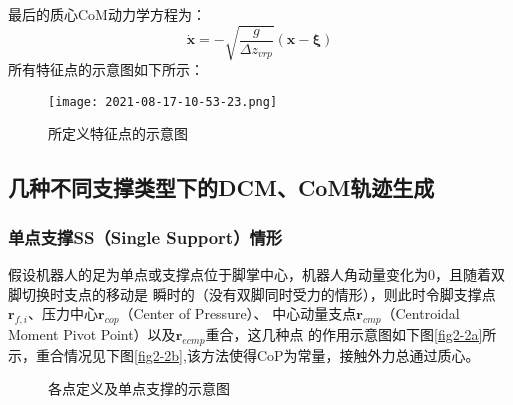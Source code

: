             最后的质心CoM动力学方程为：
            \begin{equation}
                \boldsymbol{\dot{x}}=-\sqrt{\frac{g}{\varDelta z_{vrp}}}\left( \boldsymbol{x}-\boldsymbol{\xi } \right) 
                \label{equ2-9}
            \end{equation}
            所有特征点的示意图如下所示：
            \begin{figure}[h] 
                \centering
                \texttt{[image: 2021-08-17-10-53-23.png]}
                \caption{所定义特征点的示意图} \label{fig2-1}
            \end{figure}
            \FloatBarrier
    \subsection{几种不同支撑类型下的DCM、CoM轨迹生成}
        \subsubsection{单点支撑SS（Single Support）情形}
            假设机器人的足为单点或支撑点位于脚掌中心，机器人角动量变化为0，且随着双脚切换时支点的移动是
            瞬时的（没有双脚同时受力的情形），则此时令脚支撑点$\boldsymbol{r}_{f,i}$、压力中心$\boldsymbol{r}_{cop}$（Center of Pressure）、
            中心动量支点$\boldsymbol{r}_{cmp}$（Centroidal Moment Pivot Point）以及$\boldsymbol{r}_{ecmp}$重合，这几种点
            的作用示意图如下图\ref{fig2-2a}所示，重合情况见下图\ref{fig2-2b},该方法使得CoP为常量，接触外力总通过质心。
            \begin{figure}[h] 
                \centering
                \vspace{5pt} %
                \caption{各点定义及单点支撑的示意图} \label{fig2-2}
            \end{figure}
            \FloatBarrier

